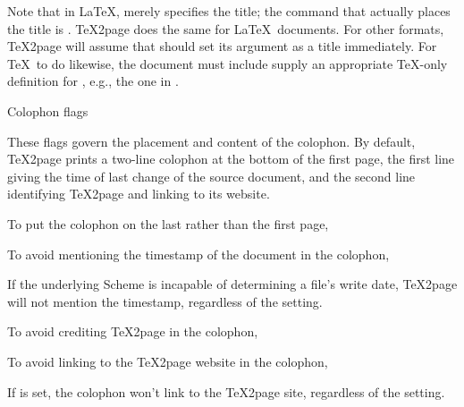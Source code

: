 
\n Note that in \LaTeX, \p{\title} merely
specifies the title; the command that actually places the
title is \p{\maketitle}.  \TeX2page does the same for \LaTeX\
documents.  For other formats, \TeX2page will assume that
\p{\title}  should set its argument as a title immediately.
For \TeX\ to do likewise, the document must include supply an
appropriate \TeX-only definition for \p{\title}, e.g., the
one in .

\beginsection Colophon flags

These flags
govern the placement and content of the colophon.
By default, \TeX2page prints a two-line colophon at the
bottom of the first page, the first line giving
the time of last change of the source document, and the
second line identifying \TeX2page and linking to its website.

To put the colophon on the last rather than the first page,


\iffalse
\n If this request is to have meaning, it should be made in the document
before the text for the second HTML page starts.  Otherwise, the default
first-page placement of the colophon will have already taken effect.
\fi

To avoid mentioning the timestamp of the document in the
colophon,


\n If the underlying
Scheme is incapable of determining a file’s write date, \TeX2page will
not mention the timestamp, regardless of the \p{\TZPcolophondisabletimestamp} setting.

To avoid crediting \TeX2page in the colophon,


To avoid linking to the \TeX2page website in the colophon,


\n If \p{\TZPcolophondisablecredit} is set, the colophon won’t link to the \TeX2page
site, regardless of the \p{\TZPcolophondisableweblink} setting.


